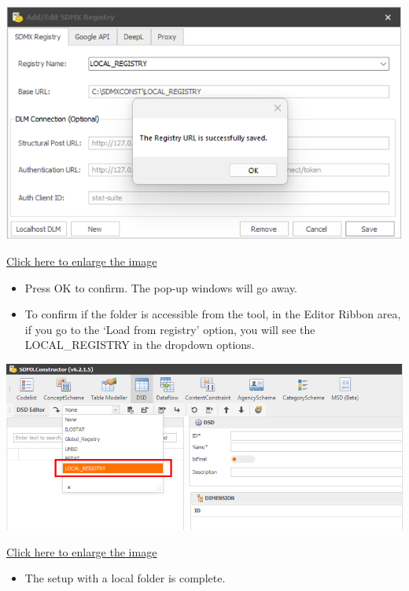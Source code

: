 \documentclass[
]{book}
\providecommand{\tightlist}{%
  \setlength{\itemsep}{0pt}\setlength{\parskip}{0pt}}
\begin{document}
\begin{center}\includegraphics[width=1\linewidth]{./images/image056} \end{center}

\href{images/image056.png}{Click here to enlarge the image}

\begin{itemize}
\tightlist
\item
  Press OK to confirm. The pop-up windows will go away.
\item
  To confirm if the folder is accessible from the tool, in the Editor Ribbon area, if you go to the `Load from registry' option, you will see the LOCAL\_REGISTRY in the dropdown options.
\end{itemize}

\begin{center}\includegraphics[width=1\linewidth]{./images/image058} \end{center}

\href{images/image058.png}{Click here to enlarge the image}

\begin{itemize}
\tightlist
\item
  The setup with a local folder is complete.
\end{itemize}
\end{document}
